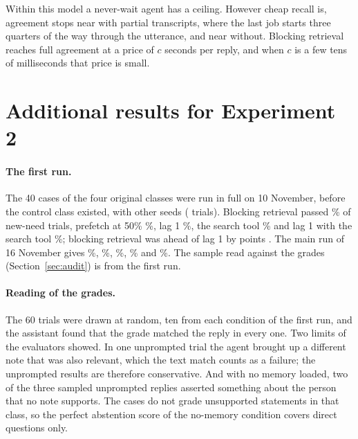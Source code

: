 \documentclass[10pt]{article}
\begin{document}
Within this model a never-wait agent has a ceiling. However cheap recall is, agreement stops near \OvPthreeq{} with partial transcripts, where the last job starts three quarters of the way through the utterance, and near \OvLone{} without. Blocking retrieval reaches full agreement at a price of $c$ seconds per reply, and when $c$ is a few tens of milliseconds that price is small.

\section{Additional results for Experiment 2}
\label{app:e2}

\paragraph{The first run.} The 40 cases of the four original classes were run in full on 10 November, before the control class existed, with other seeds (\FrTrials{} trials). Blocking retrieval passed \FrRecBlock\% of new-need trials, prefetch at 50\% \FrRecPre\%, lag 1 \FrRecLag\%, the search tool \FrRecTool\% and lag 1 with the search tool \FrRecHyb\%; blocking retrieval was ahead of lag 1 by \FrDiffBlockLag{} points \FrDiffBlockLagCI{}. The main run of 16 November gives \RecBlock\%, \RecPre\%, \RecLag\%, \RecTool\% and \RecHyb\%. The sample read against the grades (Section~\ref{sec:audit}) is from the first run.

\paragraph{Reading of the grades.} The 60 trials were drawn at random, ten from each condition of the first run, and the assistant found that the grade matched the reply in every one. Two limits of the evaluators showed. In one unprompted trial the agent brought up a different note that was also relevant, which the text match counts as a failure; the unprompted results are therefore conservative. And with no memory loaded, two of the three sampled unprompted replies asserted something about the person that no note supports. The cases do not grade unsupported statements in that class, so the perfect abstention score of the no-memory condition covers direct questions only.
\end{document}
